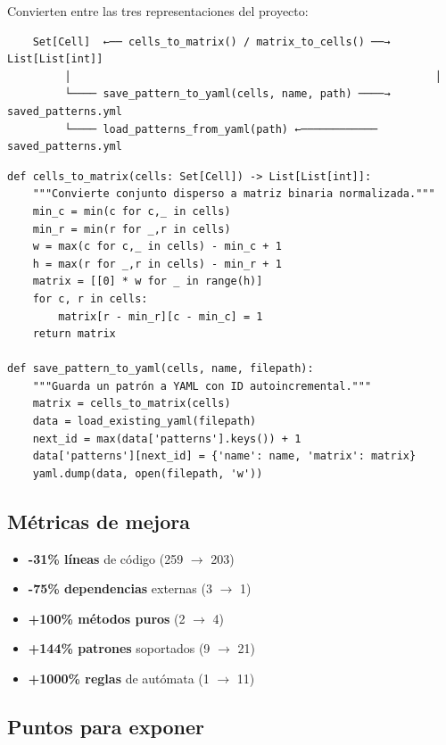 \documentclass[12pt,a4paper]{article}
\begin{document}
Convierten entre las tres representaciones del proyecto:

\begin{verbatim}
    Set[Cell]  ←── cells_to_matrix() / matrix_to_cells() ──→  List[List[int]]
         │                                                         │
         └──── save_pattern_to_yaml(cells, name, path) ────→  saved_patterns.yml
         └──── load_patterns_from_yaml(path) ←────────────  saved_patterns.yml
\end{verbatim}

\begin{lstlisting}
def cells_to_matrix(cells: Set[Cell]) -> List[List[int]]:
    """Convierte conjunto disperso a matriz binaria normalizada."""
    min_c = min(c for c,_ in cells)
    min_r = min(r for _,r in cells)
    w = max(c for c,_ in cells) - min_c + 1
    h = max(r for _,r in cells) - min_r + 1
    matrix = [[0] * w for _ in range(h)]
    for c, r in cells:
        matrix[r - min_r][c - min_c] = 1
    return matrix

def save_pattern_to_yaml(cells, name, filepath):
    """Guarda un patrón a YAML con ID autoincremental."""
    matrix = cells_to_matrix(cells)
    data = load_existing_yaml(filepath)
    next_id = max(data['patterns'].keys()) + 1
    data['patterns'][next_id] = {'name': name, 'matrix': matrix}
    yaml.dump(data, open(filepath, 'w'))
\end{lstlisting}

\subsection{Métricas de mejora}

\begin{itemize}
  \item \textbf{-31\% líneas} de código (259 $\to$ 203)
  \item \textbf{-75\% dependencias} externas (3 $\to$ 1)
  \item \textbf{+100\% métodos puros} (2 $\to$ 4)
  \item \textbf{+144\% patrones} soportados (9 $\to$ 21)
  \item \textbf{+1000\% reglas} de autómata (1 $\to$ 11)
\end{itemize}

\subsection{Puntos para exponer}
\end{document}
